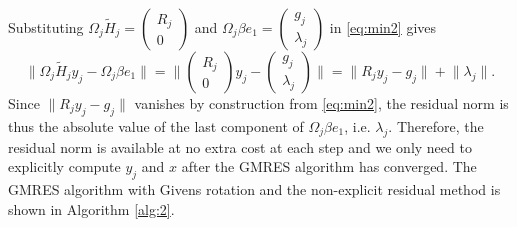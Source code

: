 \documentclass{article}
\newcommand{\norm}[1]{\lVert#1\rVert}
\begin{document}
Substituting $\Omega_j\tilde{H}_j=\begin{pmatrix} R_j \\0 \end{pmatrix}$ and  $\Omega_j \beta e_1=\begin{pmatrix} g_j \\\lambda_j \end{pmatrix}$ in \eqref{eq:min2} gives
\begin{equation*}
    \norm{ \Omega_j\tilde{H}_j y_j - \Omega_j\beta e_1 } = \norm{\begin{pmatrix} R_j \\0 \end{pmatrix} y_j - \begin{pmatrix} g_j \\\lambda_j \end{pmatrix} } = \norm{R_j y_j - g_j} + \norm{\lambda_j}.
\end{equation*}
Since $\norm{R_j y_j - g_j}$ vanishes by construction from \eqref{eq:min2}, the residual norm is thus the absolute value of the last component of $\Omega_j\beta e_1$, i.e. $\lambda_j$. Therefore, the residual norm is available at no extra cost at each step and we only need to explicitly compute $y_j$ and $x$ after the GMRES algorithm has converged. The GMRES algorithm with Givens rotation and the non-explicit residual method is shown in Algorithm \ref{alg:2}.
\end{document}
